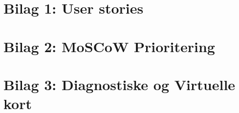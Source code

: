 \section{Bilag 1: User stories}

\newpage
\section{Bilag 2: MoSCoW Prioritering}

\section{Bilag 3: Diagnostiske og Virtuelle kort}
%
